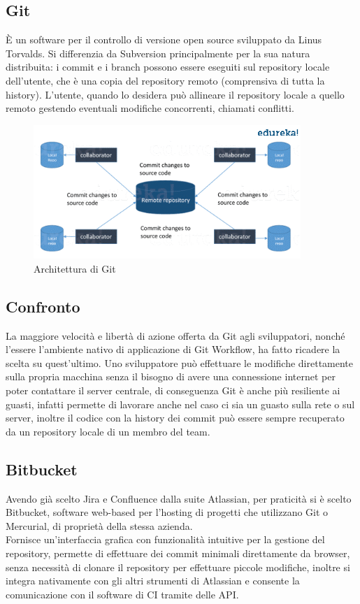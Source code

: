 \documentclass[a4paper, 12pt]{report}
\numberwithin{equation}{section}
\begin{document}
\subsection{Git}
È un software per il controllo di versione open source sviluppato da Linus Torvalds. Si differenzia da Subversion principalmente per la sua natura distribuita: i commit e i branch possono essere eseguiti sul repository locale dell’utente, che è una copia del repository remoto (comprensiva di tutta la history). L’utente, quando lo desidera può allineare il repository locale a quello remoto gestendo eventuali modifiche concorrenti, chiamati conflitti.
\begin{figure}
    \centering
    \includegraphics[width=0.9\textwidth]{imgs/git.png}
    \caption{Architettura di Git \cite{git-docs}}
    \label{fig:git}
\end{figure}
\subsection{Confronto}
La maggiore velocità e libertà di azione offerta da Git agli sviluppatori, nonché l’essere l’ambiente nativo di applicazione di Git Workflow, ha fatto ricadere la scelta su quest’ultimo. Uno sviluppatore può effettuare le modifiche direttamente sulla propria macchina senza il bisogno di avere una connessione internet per poter contattare il server centrale, di conseguenza Git è anche più resiliente ai guasti, infatti permette di lavorare anche nel caso ci sia un guasto sulla rete o sul server, inoltre il codice con la history dei commit può essere sempre recuperato da un repository locale di un membro del team.
\subsection{Bitbucket}
Avendo già scelto Jira e Confluence dalla suite Atlassian, per praticità si è scelto Bitbucket, software web-based per l’hosting di progetti che utilizzano Git o Mercurial, di proprietà della stessa azienda.\\
Fornisce un’interfaccia grafica con funzionalità intuitive per la gestione del repository, permette di effettuare dei commit minimali direttamente da browser, senza necessità di clonare il repository per effettuare piccole modifiche, inoltre si integra nativamente con gli altri strumenti di Atlassian e consente la comunicazione con il software di CI tramite delle API.
\end{document}
